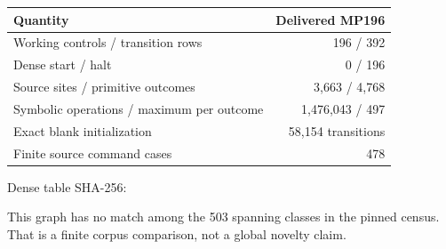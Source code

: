 \begin{center}
\begin{tabular}{lr}
\toprule Quantity & Delivered MP196\\\midrule
Working controls / transition rows & 196 / 392\\
Dense start / halt & 0 / 196\\
Source sites / primitive outcomes & 3,663 / 4,768\\
Symbolic operations / maximum per outcome & 1,476,043 / 497\\
Exact blank initialization & 58,154 transitions\\
Finite source command cases & 478\\
\bottomrule\end{tabular}\end{center}
Dense table SHA-256:
\begin{center}\small{}\end{center}
This graph has no match among the 503 spanning classes in the pinned
census. That is a finite corpus comparison, not a global novelty claim.


